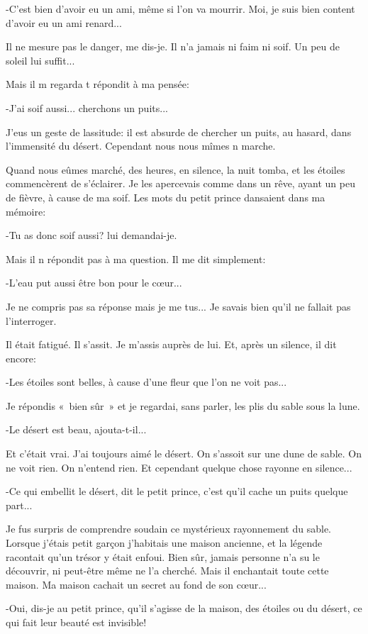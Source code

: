 \documentclass{report}
\begin{document}
-C'est bien d'avoir eu un ami, même si l'on va mourrir. Moi, je suis bien content d'avoir eu un ami renard...

Il ne mesure pas le danger, me dis-je. Il n'a jamais ni faim ni soif. Un peu de soleil lui suffit...

Mais il m regarda t répondit à ma pensée:

-J'ai soif aussi... cherchons un puits...

J'eus un geste de lassitude: il est absurde de chercher un puits, au hasard, dans l'immensité du désert. Cependant nous nous mîmes n marche.

Quand nous eûmes marché, des heures, en silence, la nuit tomba, et les étoiles commencèrent de s'éclairer. Je les apercevais comme dans un rêve, ayant un peu de fièvre, à cause de ma soif. Les mots du petit prince dansaient dans ma mémoire:

-Tu as donc soif aussi? lui demandai-je.

Mais il n répondit pas à ma question. Il me dit simplement:

-L'eau put aussi être bon pour le cœur...

Je ne compris pas sa réponse mais je me tus... Je savais bien qu'il ne fallait pas l'interroger.

Il était fatigué. Il s'assit. Je m'assis auprès de lui. Et, après un silence, il dit encore:

-Les étoiles sont belles, à cause d'une fleur que l'on ne voit pas...

Je répondis «~bien sûr~» et je regardai, sans parler, les plis du sable sous la lune.

-Le désert est beau, ajouta-t-il...

Et c'était vrai. J'ai toujours aimé le désert. On s'assoit sur une dune de sable. On ne voit rien. On n'entend rien. Et cependant quelque chose rayonne en silence...

-Ce qui embellit le désert, dit le petit prince, c'est qu'il cache un puits quelque part...

Je fus surpris de comprendre soudain ce mystérieux rayonnement du sable. Lorsque j'étais petit garçon j'habitais une maison ancienne, et la légende racontait qu'un trésor y était enfoui. Bien sûr, jamais personne n'a su le découvrir, ni peut-être même ne l'a cherché. Mais il enchantait toute cette maison. Ma maison cachait un secret au fond de son cœur...

-Oui, dis-je au petit prince, qu'il s'agisse de la maison, des étoiles ou du désert, ce qui fait leur beauté est invisible!
\end{document}
